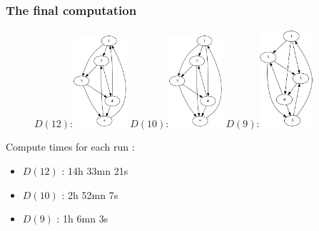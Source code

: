 \documentclass{beamer}
\begin{document}
\begin{frame}
	\frametitle{The final computation}
	\begin{figure}
		\centering
		$D(12)$:\includegraphics[width=2cm]{images/d12.png}
		$D(10)$:\includegraphics[width=2cm]{images/d10.png}
		$D(9)$:\includegraphics[width=2cm]{images/d9.png}
	\end{figure}
	Compute times for each run :
	\begin{itemize}
		\item $D(12)$ : 14h 33mn 21s
		\item $D(10)$ : 2h 52mn 7s
		\item $D(9)$ : 1h 6mn 3s
	\end{itemize}
\end{frame}
\end{document}
